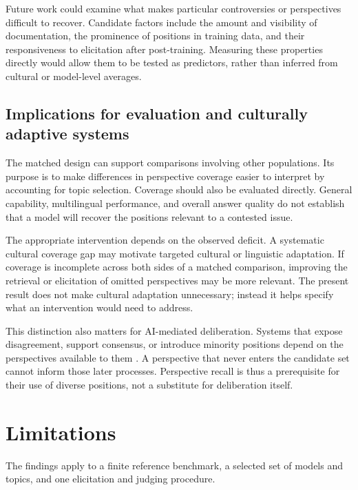 \documentclass[11pt,a4paper]{article}
\begin{document}
Future work could examine what makes particular controversies or perspectives difficult to recover. Candidate factors include the amount and visibility of documentation, the prominence of positions in training data, and their responsiveness to elicitation after post-training. Measuring these properties directly would allow them to be tested as predictors, rather than inferred from cultural or model-level averages.

\subsection{Implications for evaluation and culturally adaptive systems}
\label{sec:Implications for evaluation and culturally adaptive systems}
The matched design can support comparisons involving other populations. Its purpose is to make differences in perspective coverage easier to interpret by accounting for topic selection. Coverage should also be evaluated directly. General capability, multilingual performance, and overall answer quality do not establish that a model will recover the positions relevant to a contested issue.

The appropriate intervention depends on the observed deficit. A systematic cultural coverage gap may motivate targeted cultural or linguistic adaptation. If coverage is incomplete across both sides of a matched comparison, improving the retrieval or elicitation of omitted perspectives may be more relevant. The present result does not make cultural adaptation unnecessary; instead it helps specify what an intervention would need to address.

This distinction also matters for AI-mediated deliberation. Systems that expose disagreement, support consensus, or introduce minority positions depend on the perspectives available to them \cite{tesslerAICanHelp2024a, chiangEnhancingAIAssistedGroup2024b, leeAmplifyingMinorityVoices2025a}. A perspective that never enters the candidate set cannot inform those later processes. Perspective recall is thus a prerequisite for their use of diverse positions, not a substitute for deliberation itself.

\section{Limitations}
\label{sec:Limitations}
The findings apply to a finite reference benchmark, a selected set of models and topics, and one elicitation and judging procedure.
\end{document}
